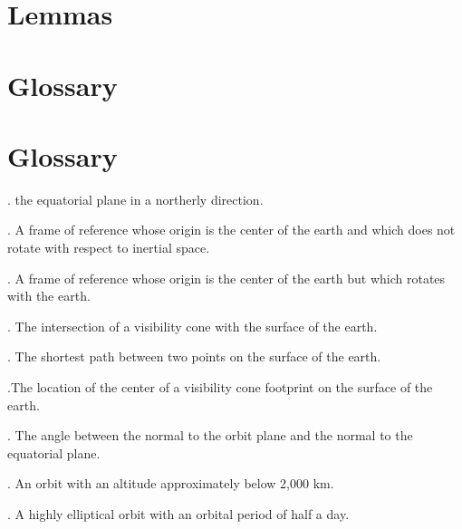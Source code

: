 \documentclass[oneside,12pt]{report}
\def\prefacesection#1{
\chapter*{#1}
\addcontentsline{toc}{chapter}{#1}
}
\begin{document}
%
%

%
%
%
%
%
%


\appendix
{}

\chapter{Lemmas}\label{Lemma}

\chapter{Glossary}\label{Glossary}
\prefacesection{Glossary}
\vspace{12pt} 

\vspace{8pt}
. 
the equatorial plane in a northerly direction. 

\vspace{8pt}
. A frame of reference whose origin is the center of the earth and which does not rotate with respect to inertial space.

\vspace{8pt}
. A frame of reference whose origin is the center of the earth but which rotates with the earth. 

\vspace{8pt} . The intersection of a visibility cone with the surface of the earth.

\vspace{8pt} . The shortest path between two points on the surface of the earth. 

\vspace{8pt} .The location of the center of a visibility cone footprint on the surface of the earth.

\vspace{8pt}
.  The angle between the normal to the orbit plane
and the normal to the equatorial plane.

\vspace{8pt} . An orbit with an altitude approximately below 2,000 km.

\vspace{8pt} . A highly elliptical orbit with an orbital period of half a day.
\end{document}
